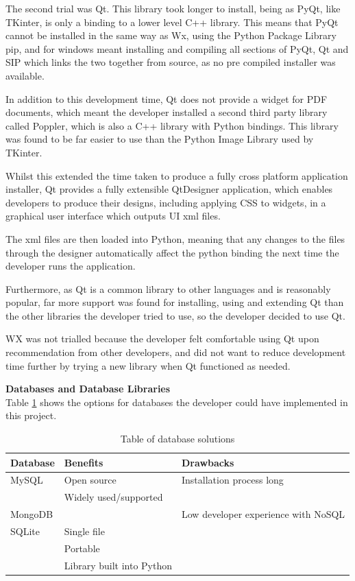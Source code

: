  
 The second trial was Qt. This library took longer to install, being as PyQt, like TKinter, is only a binding to a lower level C++ library. This means that PyQt cannot be installed in the same way as Wx, using the Python Package Library pip, and for windows meant installing and compiling all sections of PyQt, Qt and SIP which links the two together from source, as no pre compiled installer was available.
 
 In addition to this development time, Qt does not provide a widget for PDF documents, which meant the developer installed a second third party library called Poppler, which is also a C++ library with Python bindings. This library was found to be far easier to use than the Python Image Library used by TKinter.
 
 Whilst this extended the time taken to produce a fully cross platform application installer, Qt provides a fully extensible QtDesigner application, which enables developers to produce their designs, including applying CSS to widgets, in a graphical user interface which outputs UI xml files. 
 
 The xml files are then loaded into Python, meaning that any changes to the files through the designer automatically affect the python binding the next time the developer runs the application.

Furthermore, as Qt is a common library to other languages and is reasonably popular, far more support was found for installing, using and extending Qt than the other libraries the developer tried to use, so the developer decided to use Qt.

WX was not trialled because the developer felt comfortable using Qt upon recommendation from other developers, and did not want to reduce development time further by trying a new library when Qt functioned as needed.

\textbf{Databases and Database Libraries}\\
Table \ref{table:databases} shows the options for databases the developer could have implemented in this project.

\begin{table}[H]
\centering
\begin{tabular}{| l | l | l |} \hline
  {Database} & {Benefits} & {Drawbacks} \\ \hline
  MySQL & Open source & Installation process long \\
  & Widely used/supported & \\ \hline
  MongoDB & & Low developer experience with NoSQL \\ \hline
  SQLite & Single file & \\
  & Portable & \\
  & Library built into Python & \\ \hline
  
  
\end{tabular}
\caption{Table of database solutions}
\label{table:databases}
\end{table}

